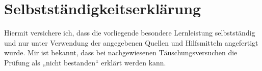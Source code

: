 \thispagestyle{empty}
\chapter*{Selbstständigkeitserklärung}
 
Hiermit versichere ich, dass die vorliegende besondere Lernleistung
selbstständig und nur unter Verwendung der angegebenen Quellen und Hilfsmitteln
angefertigt wurde. Mir ist bekannt, dass bei nachgewiesenen Täuschungsversuchen
die Prüfung als „nicht bestanden“ erklärt werden kann. 
 
\vspace{1cm}
